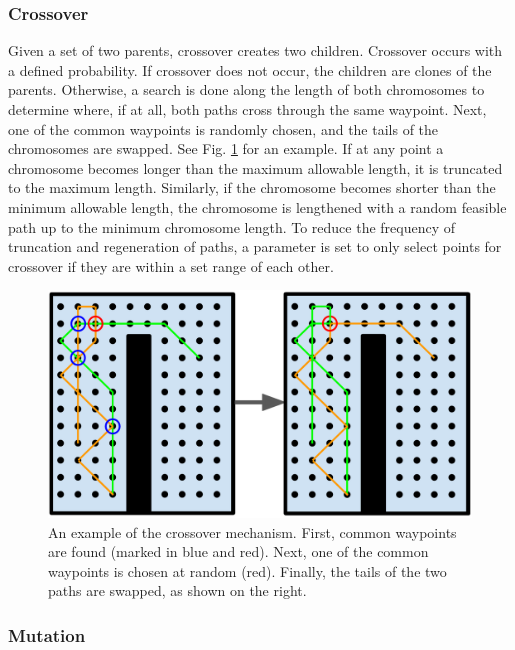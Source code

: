 \documentclass[letterpaper, 10 pt, conference]{ieeeconf}  %
\begin{document}
\subsubsection{Crossover}

Given a set of two parents, crossover creates two children. Crossover occurs with a defined probability. If crossover does not occur, the children are clones of the parents. Otherwise, a search is done along the length of both chromosomes to determine where, if at all, both paths cross through the same waypoint. Next, one of the common waypoints is randomly chosen, and the tails of the chromosomes are swapped. See Fig. \ref{fig:crossover} for an example. If at any point a chromosome becomes longer than the maximum allowable length, it is truncated to the maximum length. Similarly, if the chromosome becomes shorter than the minimum allowable length, the chromosome is lengthened with a random feasible path up to the minimum chromosome length. To reduce the frequency of truncation and regeneration of paths, a parameter is set to only select points for crossover if they are within a set range of each other.

\begin{figure}
\centering
\includegraphics[width=1.0\linewidth]{crossover.png}
\caption[An example of the coverage planner crossover mechanism.]{An example of the crossover mechanism. First, common waypoints are found (marked in blue and red). Next, one of the common waypoints is chosen at random (red). Finally, the tails of the two paths are swapped, as shown on the right.}
\label{fig:crossover}
\end{figure}

\subsubsection{Mutation}
\end{document}
